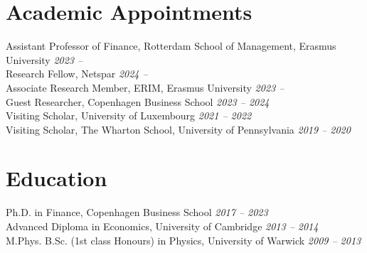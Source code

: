 \documentclass[11pt]{res} %
\newcommand{\fullhrulefill}{%
  \vspace{-1ex}%
  \hspace*{-\sectionwidth}\hrulefill%
  }
\begin{document}
\begin{resume}

\vspace{8pt} %
\section{Academic Appointments}
\fullhrulefill  \newline
Assistant Professor of Finance, Rotterdam School of Management, Erasmus University  
 \hfill \textit{2023 -- } \\
 Research Fellow, Netspar \hfill \textit{2024 -- } \\
Associate Research Member,  ERIM, Erasmus University \hfill \textit{2023 -- } \\
Guest Researcher,  Copenhagen Business School %
 \hfill \textit{2023 -- 2024} \\
Visiting Scholar,  University of Luxembourg %
\hfill \textit{2021 -- 2022} \\%
Visiting Scholar,  The Wharton School, University of Pennsylvania  \hfill \textit{2019 -- 2020} %


\vspace{8pt} %
\section{Education}
\fullhrulefill  \newline
%
%
Ph.D. in Finance, Copenhagen Business School \hfill \textit{2017 -- 2023}\\  
Advanced Diploma in Economics,  University of Cambridge  \hfill \textit{2013 -- 2014}\\
M.Phys. B.Sc. (1st class Honours) in Physics, University of Warwick   \hfill \textit{2009 -- 2013} %




\end{resume}
\end{document}
